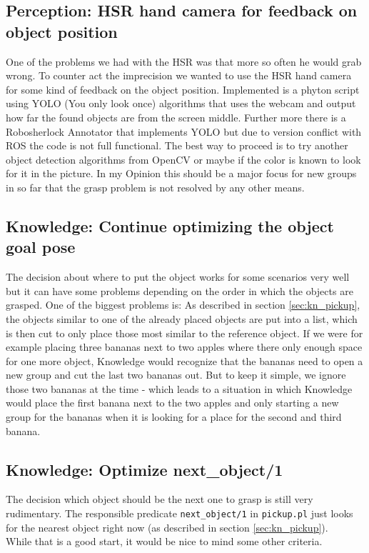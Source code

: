 \documentclass[main.tex]{subfiles}
\begin{document}
		\subsection{Perception: HSR hand camera for feedback on object position}
One of the problems we had with the HSR was that more so often he would grab wrong.
To counter act the imprecision we wanted to use the HSR hand camera for some kind of feedback on the object position.
Implemented is a phyton script using YOLO (You only look once) algorithms that uses the webcam and output how far the found objects are from the screen middle.
Further more there is a Robosherlock Annotator that implements YOLO but due to version conflict with ROS the code is not full functional.
The best way to proceed is to try another object detection algorithms from OpenCV or maybe if the color is known to look for it in the picture.
In my Opinion this should be a major focus for new groups in so far that the grasp problem is not resolved by any other means.

		\subsection{Knowledge: Continue optimizing the object goal pose}
		The decision about where to put the object works for some scenarios very well but it can have some problems depending on the order in which the objects are grasped. One of the biggest problems is: As described in section \ref{sec:kn_pickup}, the objects  similar to one of the already placed objects are put into a list, which is then cut to only place those most similar to the reference object. If we were for example placing three bananas next to two apples where there only enough space for one more object, Knowledge would recognize that the bananas need to open a new group and cut the last two bananas out. But to keep it simple, we ignore those two bananas at the time - which leads to a situation in which Knowledge would place the first banana next to the two apples and only starting a new group for the bananas when it is looking for a place for the second and third banana.
	  	
	  	\subsection{Knowledge: Optimize next\_object/1}
	  	The decision which object should be the next one to grasp is still very rudimentary. The responsible predicate \texttt{next\_object/1} in \texttt{pickup.pl} just looks for the nearest object right now (as described in section \ref{sec:kn_pickup}).\\
	  	While that is a good start, it would be nice to mind some other criteria.
	  	
\end{document}
